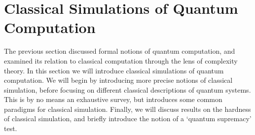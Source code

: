 \section{Classical Simulations of Quantum Computation}\label{sec:intro_classical_simulation}
The previous section discussed formal notions of quantum computation, and examined its relation to classical computation through the lens of complexity theory. In this section we will introduce classical simulations of quantum computation. We will begin by introducing more precise notions of classical simulation, before focusing on different classical descriptions of quantum systems. This is by no means an exhaustive survey, but introduces some common paradigms for classical simulation. Finally, we will discuss results on the hardness of classical simulation, and briefly introduce the notion of a `quantum supremacy' test.
